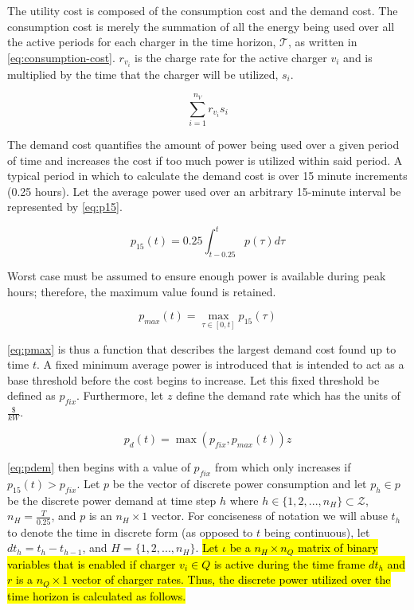 \documentclass[11pt,a4paper,final]{article}
\newcommand{\T}{\mathcal{T}}                %
\newcommand{\Qset}{Q}                       %
\newcommand{\Hset}{H}                       %
\begin{document}
The utility cost is composed of the consumption cost and the demand cost. The consumption cost is merely the summation
of all the energy being used over all the active periods for each charger in the time horizon, \(\T\), as written in
\ref{eq:consumption-cost}. \(r_{v_i}\) is the charge rate for the active charger \(v_i\) and is multiplied by the time that the
charger will be utilized, \(s_i\).

\begin{equation}
\label{eq:consumption-cost}
  \sum_{i=1}^{n_V} r_{v_i}s_i
\end{equation}

The demand cost quantifies the amount of power being used over a given period of time and increases the cost if too much
power is utilized within said period. A typical period in which to calculate the demand cost is over 15 minute
increments (0.25 hours). Let the average power used over an arbitrary 15-minute interval be represented by \ref{eq:p15}.

\begin{equation}
\label{eq:p15}
p_{15}(t) = 0.25 \int_{t-0.25}^{t} p(\tau) d\tau
\end{equation}

Worst case must be assumed to ensure enough power is available during peak hours; therefore, the maximum value found is
retained.

\begin{equation}
\label{eq:pmax}
p_{max}(t) = \max\limits_{\tau \in [0,t]}p_{15}(\tau)
\end{equation}

\ref{eq:pmax} is thus a function that describes the largest demand cost found up to time \(t\). A fixed minimum average power is
introduced that is intended to act as a base threshold before the cost begins to increase. Let this fixed threshold be
defined as \(p_{fix}\). Furthermore, let \(z\) define the demand rate which has the units of \(\frac{\$}{kW}\).

\begin{equation}
\label{eq:pdem}
p_d(t) = \max(p_{fix},p_{max}(t))z
\end{equation}

\ref{eq:pdem} then begins with a value of \(p_{fix}\) from which only increases if \(p_{15}(t) > p_{fix}\). Let \(p\) be the vector
of discrete power consumption and let \(p_h \in p\) be the discrete power demand at time step \(h\) where \(h \in \{ 1, 2, ...,
n_H \} \subset \mathcal{Z}\), \(n_H = \frac{T}{0.25}\), and \(p\) is an \(n_H \times 1\) vector. For conciseness of notation we will abuse \(t_h\) to
denote the time in discrete form (as opposed to \(t\) being continuous), let \(dt_h = t_h - t_{h-1}\), and \(\Hset = \{ 1, 2,
..., n_H \}\). \hl{Let $\iota$ be a $n_H \times n_Q$ matrix of binary variables that is enabled if charger $v_i \in \Qset$ is active during the time frame $dt_h$ and $r$ is a $n_Q \times 1$ vector of charger rates. Thus, the discrete power utilized over the time horizon is calculated as follows.}
\end{document}
